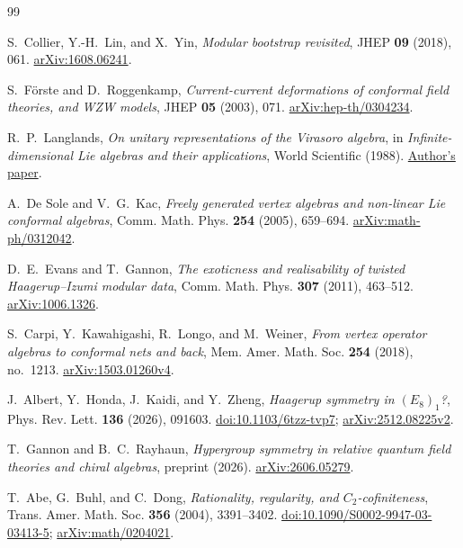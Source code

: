 \begin{thebibliography}{99}
\raggedright



S.~Collier, Y.-H.~Lin, and X.~Yin,
\emph{Modular bootstrap revisited},
JHEP \textbf{09} (2018), 061.
\href{https://arxiv.org/abs/1608.06241}{arXiv:1608.06241}.

S.~F\"orste and D.~Roggenkamp,
\emph{Current-current deformations of conformal field theories, and WZW models},
JHEP \textbf{05} (2003), 071.
\href{https://arxiv.org/abs/hep-th/0304234}{arXiv:hep-th/0304234}.

R.~P.~Langlands,
\emph{On unitary representations of the Virasoro algebra},
in \emph{Infinite-dimensional Lie algebras and their applications},
World Scientific (1988).
\href{https://publications.ias.edu/sites/default/files/VirasoroAlg-ps.pdf}{Author's paper}.

A.~De Sole and V.~G.~Kac,
\emph{Freely generated vertex algebras and non-linear Lie conformal algebras},
Comm. Math. Phys. \textbf{254} (2005), 659--694.
\href{https://arxiv.org/abs/math-ph/0312042}{arXiv:math-ph/0312042}.

D.~E.~Evans and T.~Gannon,
\emph{The exoticness and realisability of twisted Haagerup--Izumi modular data},
Comm. Math. Phys. \textbf{307} (2011), 463--512.
\href{https://arxiv.org/abs/1006.1326}{arXiv:1006.1326}.

S.~Carpi, Y.~Kawahigashi, R.~Longo, and M.~Weiner,
\emph{From vertex operator algebras to conformal nets and back},
Mem. Amer. Math. Soc. \textbf{254} (2018), no.~1213.
\href{https://arxiv.org/abs/1503.01260v4}{arXiv:1503.01260v4}.

J.~Albert, Y.~Honda, J.~Kaidi, and Y.~Zheng,
\emph{Haagerup symmetry in $(E_8)_1$?},
Phys. Rev. Lett. \textbf{136} (2026), 091603.
\href{https://doi.org/10.1103/6tzz-tvp7}{doi:10.1103/6tzz-tvp7};
\href{https://arxiv.org/abs/2512.08225v2}{arXiv:2512.08225v2}.

T.~Gannon and B.~C.~Rayhaun,
\emph{Hypergroup symmetry in relative quantum field theories and chiral algebras},
preprint (2026).
\href{https://arxiv.org/abs/2606.05279}{arXiv:2606.05279}.

T.~Abe, G.~Buhl, and C.~Dong,
\emph{Rationality, regularity, and $C_2$-cofiniteness},
Trans. Amer. Math. Soc. \textbf{356} (2004), 3391--3402.
\href{https://doi.org/10.1090/S0002-9947-03-03413-5}{doi:10.1090/S0002-9947-03-03413-5};
\href{https://arxiv.org/abs/math/0204021}{arXiv:math/0204021}.


\end{thebibliography}
